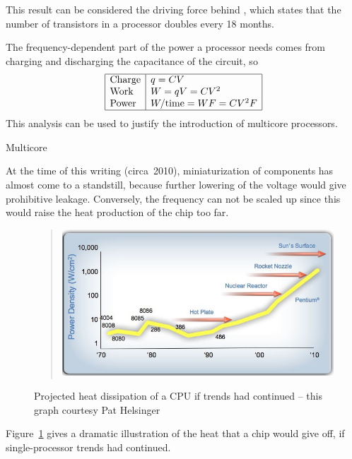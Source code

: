 This result can be considered
the driving force behind ,
which states that the number of transistors in a processor
doubles every 18 months.

The frequency-dependent part of the power a processor needs
comes from charging and discharging the capacitance of the circuit, so
\begin{equation}
\begin{array}{|l|l|} \hline
\hbox{Charge}&q=CV\\
\hbox{Work}&W=qV=CV^2\\
\hbox{Power}&W/\hbox{time}=WF=CV^2F \\ \hline
\end{array}
\label{eq:power}
\end{equation}
This analysis can be used to justify the introduction of multicore processors.

 {Multicore}

At the time of this writing (circa~2010), miniaturization of
components has almost come to a standstill, because further lowering
of the voltage would give prohibitive leakage. Conversely, the
frequency can not be scaled up since this would raise the heat
production of the chip too far. 
%
\begin{figure}[ht]
  \begin{quote}
  \includegraphics[scale=.6]{graphics/chipheat0}
  \end{quote}
  \caption{Projected heat dissipation of a CPU if trends had
    continued -- this graph courtesy Pat Helsinger}
  \label{fig:chipheat}
\end{figure}
%
Figure~\ref{fig:chipheat} gives a dramatic illustration of the heat
that a chip would give off, if single-processor trends had
continued.

